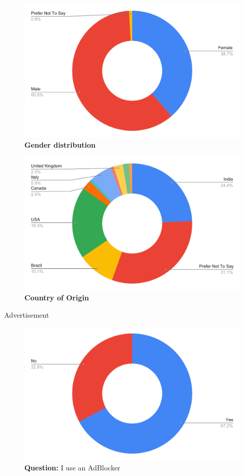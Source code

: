 \begin{figure}[H]
  \centering
  \includegraphics[width=13cm]{thesis/paper/images/p1_gender.pdf}
  \textbf{Gender distribution}
\end{figure}

\begin{figure}[H]
  \centering
  \includegraphics[width=13cm]{thesis/paper/images/p1_country.pdf}
  \textbf{Country of Origin}
\end{figure}

Advertisement
 
\begin{figure}[H]
  \centering
  \includegraphics[width=13cm]{thesis/paper/images/p1_q4.pdf}
  \textbf{Question:} I use an AdBlocker
\end{figure}

